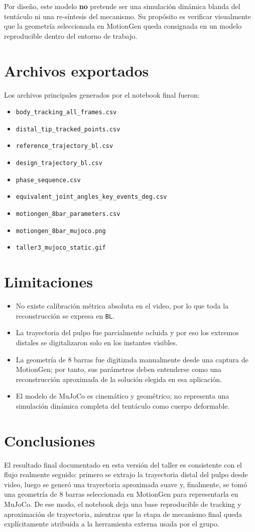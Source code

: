 \documentclass[11pt]{article}
\begin{document}
Por diseño, este modelo \textbf{no} pretende ser una simulación dinámica blanda del tentáculo ni una re-síntesis del mecanismo. Su propósito es verificar visualmente que la geometría seleccionada en MotionGen queda consignada en un modelo reproducible dentro del entorno de trabajo.

\section*{Archivos exportados}
Los archivos principales generados por el notebook final fueron:
\begin{itemize}[leftmargin=1.6em]
\item \texttt{body\_tracking\_all\_frames.csv}
\item \texttt{distal\_tip\_tracked\_points.csv}
\item \texttt{reference\_trajectory\_bl.csv}
\item \texttt{design\_trajectory\_bl.csv}
\item \texttt{phase\_sequence.csv}
\item \texttt{equivalent\_joint\_angles\_key\_events\_deg.csv}
\item \texttt{motiongen\_8bar\_parameters.csv}
\item \texttt{motiongen\_8bar\_mujoco.png}
\item \texttt{taller3\_mujoco\_static.gif}
\end{itemize}

\section*{Limitaciones}
\begin{itemize}[leftmargin=1.6em]
\item No existe calibración métrica absoluta en el video, por lo que toda la reconstrucción se expresa en \texttt{BL}.
\item La trayectoria del pulpo fue parcialmente ocluida y por eso los extremos distales se digitalizaron solo en los instantes visibles.
\item La geometría de 8 barras fue digitizada manualmente desde una captura de MotionGen; por tanto, sus parámetros deben entenderse como una reconstrucción aproximada de la solución elegida en esa aplicación.
\item El modelo de MuJoCo es cinemático y geométrico; no representa una simulación dinámica completa del tentáculo como cuerpo deformable.
\end{itemize}

\section*{Conclusiones}
El resultado final documentado en esta versión del taller es consistente con el flujo realmente seguido: primero se extrajo la trayectoria distal del pulpo desde video, luego se generó una trayectoria aproximada suave y, finalmente, se tomó una geometría de 8 barras seleccionada en MotionGen para representarla en MuJoCo. De ese modo, el notebook deja una base reproducible de tracking y aproximación de trayectoria, mientras que la etapa de mecanismo final queda explícitamente atribuida a la herramienta externa usada por el grupo.
\end{document}
